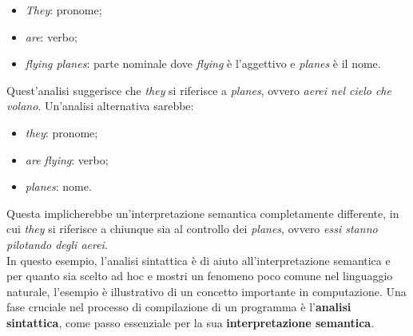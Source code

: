 \documentclass[12pt]{report}
\begin{document}
	\begin{itemize}
		\item \textit{They}: pronome;
		\item \textit{are}: verbo;
		\item \textit{flying planes}: parte nominale dove \textit{flying} è l'aggettivo e \textit{planes} è il nome.
	\end{itemize}
	Quest'analisi suggerisce che \textit{they} si riferisce a \textit{planes}, ovvero \textit{aerei nel cielo che volano}. Un'analisi alternativa sarebbe:
	\begin{itemize}
		\item \textit{they}: pronome;
		\item \textit{are flying}: verbo;
		\item \textit{planes}: nome.
	\end{itemize}
	Questa implicherebbe un'interpretazione semantica completamente differente, in cui \textit{they} si riferisce a chiunque sia al controllo dei \textit{planes}, ovvero \textit{essi stanno pilotando degli aerei}. \\
	In questo esempio, l'analisi sintattica è di aiuto all'interpretazione semantica e per quanto sia scelto ad hoc e mostri un fenomeno poco comune nel linguaggio naturale, l'esempio è illustrativo di un concetto importante in computazione. Una fase cruciale nel processo di compilazione di un programma è l'\textbf{analisi sintattica}, come passo essenziale per la sua \textbf{interpretazione semantica}. \\
\end{document}
